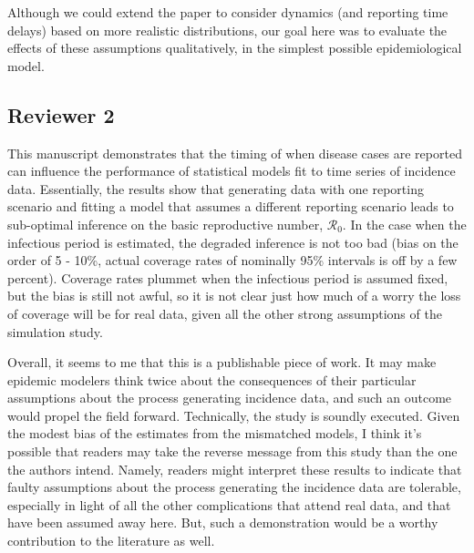 \documentclass[12pt]{article}
\newcommand{\rev}{\subsection*}
\newcommand{\revtext}{\textsf}
\begin{document}
Although we could extend the paper to consider dynamics (and reporting time delays) based on more realistic distributions, our goal here was to evaluate the effects of these assumptions qualitatively, in the simplest possible epidemiological model.

\rev{Reviewer 2}

\revtext{This manuscript demonstrates that the timing of when disease cases are reported can influence the performance of statistical models fit to time series of incidence data.  Essentially, the results show that generating data with one reporting scenario and fitting a model that assumes a different reporting scenario leads to sub-optimal inference on the basic reproductive number, $\mathcal R_0$.  In the case when the infectious period is estimated, the degraded inference is not too bad (bias on the order of 5 - 10\%, actual coverage rates of nominally 95\% intervals is off by a few percent).  Coverage rates plummet when the infectious period is assumed fixed, but the bias is still not awful, so it is not clear just how much of a worry the loss of coverage will be for real data, given all the other strong assumptions of the simulation study.}

\revtext{Overall, it seems to me that this is a publishable piece of work.  It may make epidemic modelers think twice about the consequences of their particular assumptions about the process generating incidence data, and such an outcome would propel the field forward.  Technically, the study is soundly executed.  Given the modest bias of the estimates from the mismatched models, I think it's possible that readers may take the reverse message from this study than the one the authors intend.  Namely, readers might interpret these results to indicate that faulty assumptions about the process generating the incidence data are tolerable, especially in light of all the other complications that attend real data, and that have been assumed away here.  But, such a demonstration would be a worthy contribution to the literature as well.}
\end{document}
